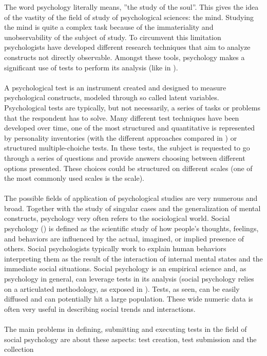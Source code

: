 The word psychology literally means, ”the study of the soul”. This gives the idea of the vastity of the field of study of psychological sciences: the mind.
Studying the mind is quite a complex task because of the immateriality and unobservability of the subject of study.
To circumvent this limitation psychologists have developed different research techniques that aim to analyze constructs not directly observable.
Amongst these tools, psychology makes a significant use of tests to perform its analysis (like in \cite{Cohen-1992}).\\
\\
A psychological test is an instrument created and designed to measure psychological constructs, modeled through so called latent variables.
Psychological tests are typically, but not necessarily, a series of tasks or problems that the respondent has to solve.
Many different test techniques have been developed over time, one of the most structured and quantitative is represented by personality inventories
(with the different approaches compared in \cite{Burisch-1984}) or structured multiple-choiche tests.
In these tests, the subject is requested to go through a series of questions and provide answers choosing between different options presented.
These choices could be structured on different scales (one of the most commonly used scales is the \cite{Likert-1932} scale).\\
\\
The possible fields of application of psychological studies are very numerous and broad.
Together with the study of singular cases and the generalization of mental constructs, psychology very often refers to the sociological world.
Social psychology (\cite{Smith-2006}) is defined as the scientific study of how people's thoughts, feelings, and behaviors are inﬂuenced by the actual, imagined,
or implied presence of others.
Social psychologists typically work to explain human behaviors interpreting them as the result of the interaction of internal mental states and the immediate
social situations.
Social psychology is an empirical science and, as psychology in general, can leverage tests in its analysis (social psychology relies on a articulated methodology,
as exposed in \cite{Reis-2000}).
Tests, as seen, can be easily diffused and can potentially hit a large population.
These wide numeric data is often very useful in describing social trends and interactions.\\
\\
The main problems in defining, submitting and executing tests in the field of social psychology are about these aspects: test creation, test submission and the collection
